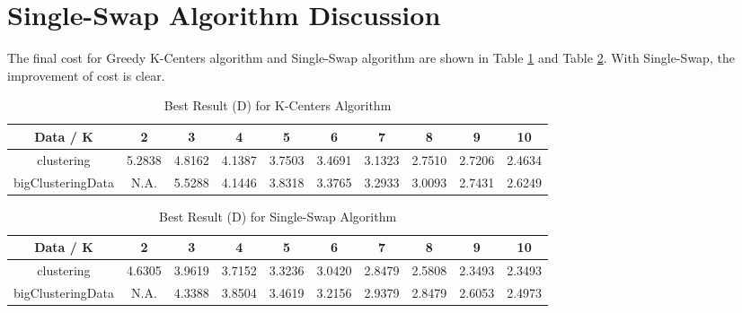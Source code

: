 \section{\Large Single-Swap Algorithm Discussion}

The final cost for Greedy K-Centers algorithm and Single-Swap algorithm are shown in Table \ref{table:best_kcenter2} and Table \ref{table:best_single2}. With Single-Swap, the improvement of cost is clear.

\begin{table}[H]
	\centering
	\caption{Best Result (D) for K-Centers Algorithm}
	\label{table:best_kcenter2}	
	\begin{tabular}{ c | c | c | c | c | c | c | c | c | c}
		\hline \hline
		Data / K      & 2     &    3    & 4    & 5     & 6    & 7    & 8   & 9    & 10 \\[0.1cm]
		\hline
	clustering	        & 5.2838 &    4.8162 & 4.1387 & 3.7503 & 3.4691 & 3.1323 & 2.7510 & 2.7206 & 2.4634 \\[0.1cm]
bigClusteringData & N.A. &    5.5288 & 4.1446 & 3.8318 & 3.3765 & 3.2933 & 3.0093 & 2.7431 & 2.6249 \\[0.1cm]
		\hline	
	\end{tabular}
\end{table}

\begin{table}[H]
	\centering
	\caption{Best Result (D) for Single-Swap Algorithm}
	\label{table:best_single2}	
	\begin{tabular}{ c | c | c | c | c | c | c | c | c | c}
		\hline \hline
		Data / K      & 2     &    3    & 4    & 5     & 6    & 7    & 8   & 9    & 10 \\[0.1cm]
		\hline
	clustering	        & 4.6305 &    3.9619 & 3.7152 & 3.3236 & 3.0420 & 2.8479 & 2.5808 & 2.3493 & 2.3493 \\[0.1cm]
bigClusteringData & N.A. &    4.3388 & 3.8504 & 3.4619 & 3.2156 & 2.9379 & 2.8479 & 2.6053 & 2.4973 \\[0.1cm]
		\hline	
	\end{tabular}
\end{table}


\clearpage

%
%
%



